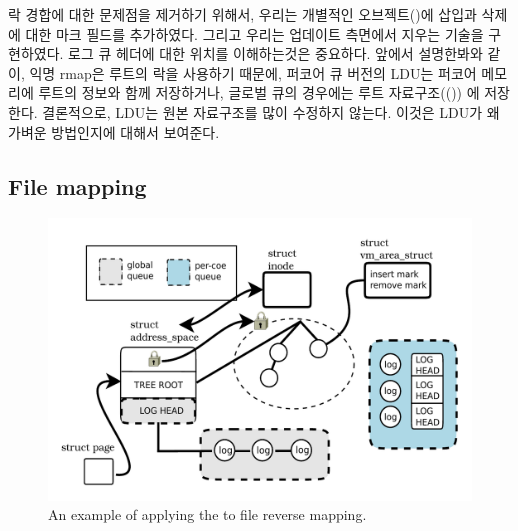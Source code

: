 락 경합에 대한 문제점을 제거하기 위해서, 우리는 개별적인 오브젝트()에 
삽입과 삭제에 대한 마크 필드를 추가하였다. 
그리고 우리는 업데이트 측면에서 지우는 기술을 구현하였다.
로그 큐 헤더에 대한 위치를 이해하는것은 중요하다.
앞에서 설명한봐와 같이, 익명 rmap은 루트의 락을 사용하기 때문에, 퍼코어 큐 버전의 LDU는 
퍼코어 메모리에 루트의 정보와 함께 저장하거나, 글로벌 큐의 경우에는 루트 자료구조(())
에 저장한다. 
결론적으로, LDU는 원본 자료구조를 많이 수정하지 않는다. 이것은 LDU가 왜 가벼운 방법인지에 
대해서 보여준다.

\subsection{File mapping}

\begin{figure}[tb]
  \begin{center}
     \includegraphics[width=1\textwidth,height=1\textheight,keepaspectratio]{fig/file_rmap}
  \end{center}
  \caption{An example of applying the \LDU to file reverse mapping.}
  \label{fig:fileramp}
\end{figure}

